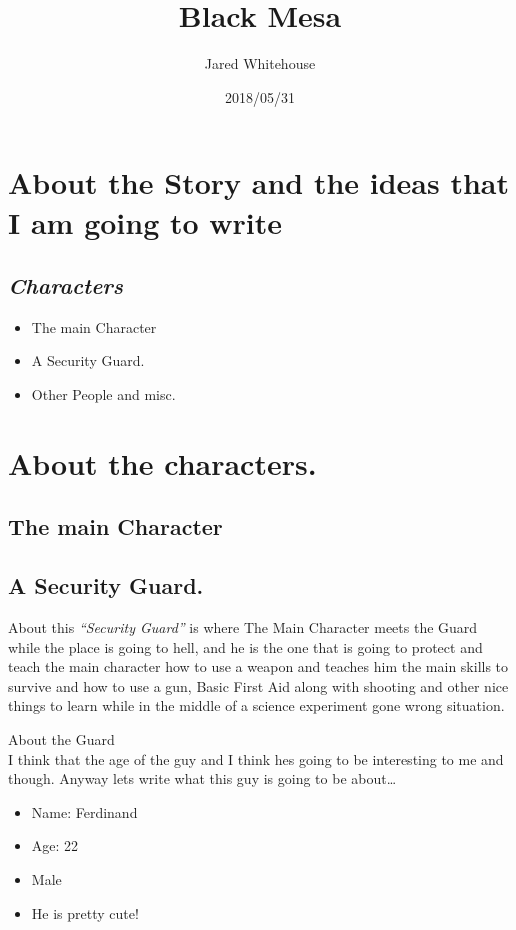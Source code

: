 \documentclass[14pt,letterpaper]{book}
\title{Black Mesa}
\author{Jared Whitehouse}
\date{2018/05/31}
\begin{document}
\flushleft
\maketitle
\section{About the Story and the ideas that I am going to write}
\subsection{\textit{Characters}}
\begin{itemize}
\item The main Character
\par
\item A Security Guard.
\par
\item Other People and misc.
\end{itemize}

\section{About the characters.}
\subsection{The main Character}
\subsection{A Security Guard.}

About this \textit{``Security Guard''} is where The Main Character meets the Guard while the place is going to hell, and he is the one that is going to protect and teach the main character how to use a weapon and teaches him the main skills to survive and how to use a gun, Basic First Aid along with shooting and other nice things to learn while in the middle of a science experiment gone wrong situation. 

About the Guard
\\
I think that the age of the guy and I think hes going to be interesting to me and though.
Anyway lets write what this guy is going to be about\dots

\begin{itemize}
	\item Name: Ferdinand
	\item Age: 22
	\item Male
	\item He is pretty cute! 
\end{itemize}
 
\end{document}

